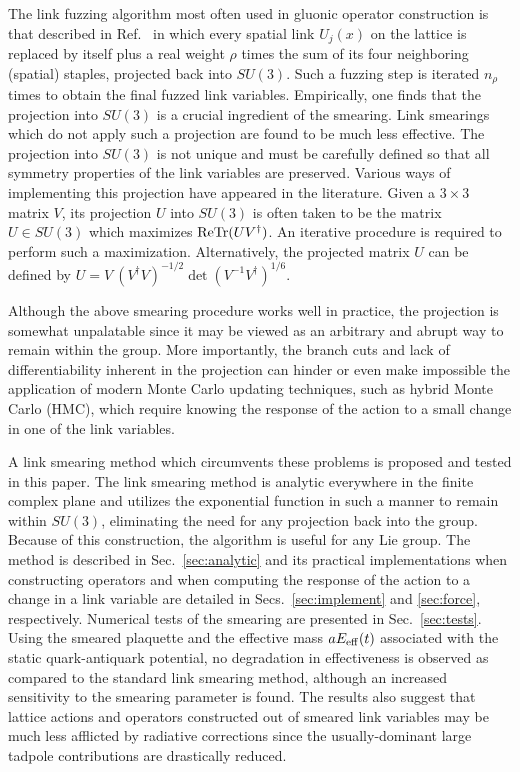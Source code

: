 The link fuzzing algorithm most often used in gluonic operator construction
is that described in
Ref.~\cite{APEsmear} in which every spatial link $U_j(x)$ on the lattice
is replaced by itself plus a real weight $\rho$ 
times the sum of its four neighboring
(spatial) staples, projected back into $SU(3)$.  Such a fuzzing step is
iterated $n_\rho$ times to obtain the final fuzzed link variables.
Empirically, one finds that the projection into $SU(3)$ is a crucial
ingredient of the smearing.  Link smearings which do not apply such
a projection are found to be much less effective.  The projection into
$SU(3)$ is not unique and must be carefully defined so that all symmetry
properties of the link variables are preserved.  Various ways of implementing
this projection have appeared in the literature.  Given a $3\times 3$
matrix $V$, its projection $U$ into $SU(3)$ is often taken to be the
matrix $U\in SU(3)$ which maximizes $\mbox{ReTr}(UV^\dagger)$.  An iterative
procedure is required to perform such a maximization.  
Alternatively\cite{su3projectA}, the projected matrix $U$ can be defined by
$ U = V\ (V^\dagger V)^{-1/2} \det(V^{-1}V^\dagger)^{1/6}.$ 

Although the above smearing procedure works well in practice, the
projection is somewhat unpalatable since it may be viewed as an
arbitrary and abrupt way to remain within the group.  More importantly,
the branch cuts and lack of differentiability inherent in the projection
can hinder or even make impossible the application of modern Monte Carlo
updating techniques, such as hybrid Monte Carlo (HMC)\cite{hmc}, which
require knowing the response of the action to a small change in one of
the link variables.

A link smearing method which circumvents these problems is proposed
and tested in this paper.  The link smearing method is analytic
everywhere in the finite complex plane and utilizes the exponential
function in such a manner to remain within $SU(3)$, eliminating the
need for any projection back into the group.  Because of this construction,
the algorithm is useful for any Lie group.  The method is described
in Sec.~\ref{sec:analytic} and its practical implementations when
constructing operators and when computing the response of the action
to a change in a link variable are detailed in 
Secs.~\ref{sec:implement} and \ref{sec:force}, respectively.
Numerical tests of the smearing are presented in Sec.~\ref{sec:tests}.
Using the smeared plaquette and the effective mass $aE_{\rm eff}(t)$
associated with the static quark-antiquark potential, no
degradation in effectiveness is observed as compared to the standard
link smearing method, although an increased sensitivity to the
smearing parameter is found.  The results also suggest that lattice
actions and operators constructed out of smeared link variables may
be much less afflicted by radiative corrections since the
usually-dominant large tadpole contributions are drastically reduced.

